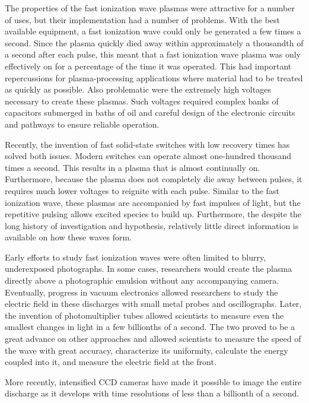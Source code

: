 The properties of the fast ionization wave plasmas were attractive for a number
of uses, but their implementation had a number of problems. With the best
available equipment, a fast ionization wave could only be generated a few times
a second. Since the plasma quickly died away within approximately a thousandth
of a second after each pulse, this meant that a fast ionization wave plasma was
only effectively on for a percentage of the time it was operated. This had
important repercussions for plasma-processing applications where material had to
be treated as quickly as possible. Also problematic were the extremely high
voltages necessary to create these plasmas. Such voltages required complex banks
of capacitors submerged in baths of oil and careful design of the electronic
circuits and pathways to ensure reliable operation.

Recently, the invention of fast solid-state switches with low recovery times has
solved both issues. Modern switches can operate almost one-hundred thousand
times a second. This results in a plasma that is almost continually on.
Furthermore, because the plasma does not completely die away between pulses, it
requires much lower voltages to reignite with each pulse. Similar to the fast
ionization wave, these plasmas are accompanied by fast impulses of light, but
the repetitive pulsing allows excited species to build up. Furthermore, the
despite the long history of investigation and hypothesis, relatively little
direct information is available on how these waves form.

Early efforts to study fast ionization waves were often limited to blurry,
underexposed photographs. In some cases, researchers would create the plasma
directly above a photographic emulsion without any accompanying camera.
Eventually, progress in vacuum electronics allowed researchers to study the
electric field in these discharges with small metal probes and oscillographs.
Later, the invention of photomultiplier tubes allowed scientists to measure even
the smallest changes in light in a few billionths of a second. The two proved to
be a great advance on other approaches and allowed scientists to measure the
speed of the wave with great accuracy, characterize its uniformity, calculate
the energy coupled into it, and measure the electric field at the front.

More recently, intensified CCD cameras have made it possible to image the entire
discharge as it develops with time resolutions of less than a billionth of a
second.

